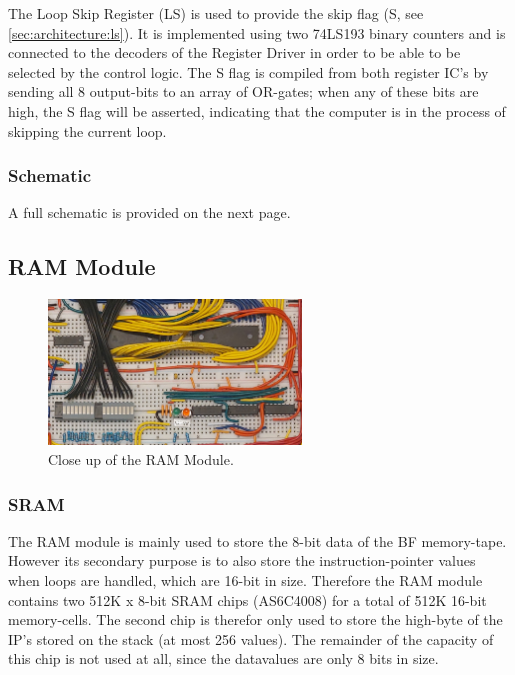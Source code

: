 The Loop Skip Register (LS) is used to provide the skip flag (S, see \ref{sec:architecture:ls}). It is implemented using two 74LS193 binary counters and is connected to the decoders of the Register Driver in order to be able to be selected by the control logic. The S flag is compiled from both register IC's by sending all 8 output-bits to an array of OR-gates; when any of these bits are high, the S flag will be asserted, indicating that the computer is in the process of skipping the current loop.


\subsubsection{Schematic}
A full schematic is provided on the next page.





\subsection{RAM Module}
\begin{figure}[H]
  \centering
  \includegraphics[width=0.6\textwidth]{img/ramcloseup}
  \caption{Close up of the RAM Module.}
  \label{fig:ramcloseup}
\end{figure}

\subsubsection{SRAM}
The RAM module is mainly used to store the 8-bit data of the BF memory-tape. However its secondary purpose is to also store the instruction-pointer values when loops are handled, which are 16-bit in size. Therefore the RAM module contains two 512K x 8-bit SRAM chips (AS6C4008) for a total of 512K 16-bit memory-cells. The second chip is therefor only used to store the high-byte of the IP's stored on the stack (at most 256 values). The remainder of the capacity of this chip is not used at all, since the datavalues are only 8 bits in size.


